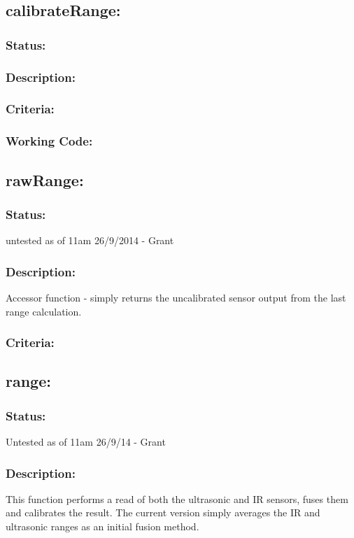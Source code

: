 \documentclass[]{article}
\begin{document}
\subsection{calibrateRange:}
\subsubsection{Status:}

\subsubsection{Description:}

\subsubsection{Criteria:}

\subsubsection{Working Code:}

\subsection{rawRange:}
\subsubsection{Status:}
untested as of 11am 26/9/2014 - Grant

\subsubsection{Description:}
Accessor function - simply returns the uncalibrated sensor output from the last range calculation.

\subsubsection{Criteria:}

\subsection{range:}
\subsubsection{Status:}
Untested as of 11am 26/9/14 - Grant

\subsubsection{Description:}
This function performs a read of both the ultrasonic and IR sensors, fuses them and calibrates the result. The current version simply averages the IR and ultrasonic ranges as an initial fusion method.
\end{document}
